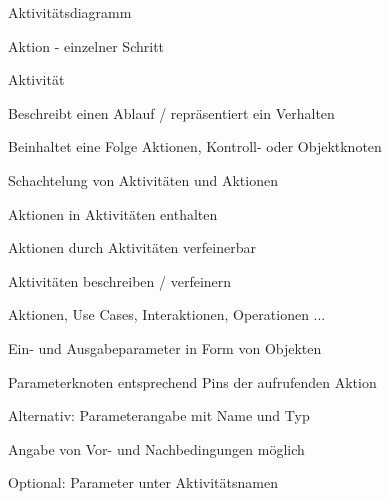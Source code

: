 \documentclass[a4paper]{article}
\begin{document}
\begin{multicols}{3}
  \begin{itemize*}
    \item Aktivitätsdiagramm
          \begin{itemize*}
            \item Aktion - einzelner Schritt
            \item Aktivität
                  \begin{itemize*}
                    \item Beschreibt einen Ablauf / repräsentiert ein Verhalten
                          \begin{itemize*}
                            \item Beinhaltet eine Folge Aktionen, Kontroll- oder Objektknoten
                          \end{itemize*}
                    \item Schachtelung von Aktivitäten und Aktionen
                          \begin{itemize*}
                            \item Aktionen in Aktivitäten enthalten
                            \item Aktionen durch Aktivitäten verfeinerbar
                          \end{itemize*}
                    \item Aktivitäten beschreiben / verfeinern
                          \begin{itemize*}
                            \item Aktionen, Use Cases, Interaktionen, Operationen ...
                          \end{itemize*}
                    \item Ein- und Ausgabeparameter in Form von Objekten
                          \begin{itemize*}
                            \item Parameterknoten entsprechend Pins der aufrufenden Aktion
                            \item Alternativ: Parameterangabe mit Name und Typ
                          \end{itemize*}
                    \item Angabe von Vor- und Nachbedingungen möglich
                    \item Optional: Parameter unter Aktivitätsnamen
                  \end{itemize*}
          \end{itemize*}
  \end{itemize*}


\end{multicols}
\end{document}
